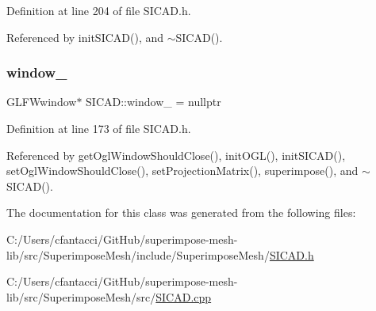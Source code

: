 Definition at line 204 of file S\+I\+C\+A\+D.\+h.



Referenced by init\+S\+I\+C\+A\+D(), and $\sim$\+S\+I\+C\+A\+D().

\mbox{\label{classSICAD_a3e55fa9ffa99ef200bfc15d6a105698a}} 
\subsubsection{\texorpdfstring{window\+\_\+}{window\_}}
{\footnotesize\ttfamily G\+L\+F\+Wwindow$\ast$ S\+I\+C\+A\+D\+::window\+\_\+ = nullptr\hspace{0.3cm}{\ttfamily [private]}}



Definition at line 173 of file S\+I\+C\+A\+D.\+h.



Referenced by get\+Ogl\+Window\+Should\+Close(), init\+O\+G\+L(), init\+S\+I\+C\+A\+D(), set\+Ogl\+Window\+Should\+Close(), set\+Projection\+Matrix(), superimpose(), and $\sim$\+S\+I\+C\+A\+D().



The documentation for this class was generated from the following files\+:\begin{DoxyCompactItemize}
\item 
C\+:/\+Users/cfantacci/\+Git\+Hub/superimpose-\/mesh-\/lib/src/\+Superimpose\+Mesh/include/\+Superimpose\+Mesh/\mbox{\hyperlink{SICAD_8h}{S\+I\+C\+A\+D.\+h}}\item 
C\+:/\+Users/cfantacci/\+Git\+Hub/superimpose-\/mesh-\/lib/src/\+Superimpose\+Mesh/src/\mbox{\hyperlink{SICAD_8cpp}{S\+I\+C\+A\+D.\+cpp}}\end{DoxyCompactItemize}
